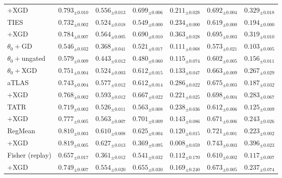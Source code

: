 \documentclass{article} %
\newcommand{\thetab}{\theta_0}
\begin{document}
\begin{table}[t]
\begin{tabular}{lcccccc}
\quad $+$XGD             & $0.793_{\pm0.010}$ & $0.556_{\pm0.013}$ & $0.699_{\pm0.006}$ & $0.211_{\pm0.028}$ & $0.692_{\pm0.004}$ & $0.329_{\pm0.018}$ \\
TIES                     & $0.732_{\pm0.002}$ & $0.524_{\pm0.018}$ & $0.549_{\pm0.000}$ & $0.234_{\pm0.000}$ & $0.619_{\pm0.000}$ & $0.194_{\pm0.000}$ \\
\quad $+$XGD             & $0.784_{\pm0.007}$ & $0.564_{\pm0.005}$ & $0.690_{\pm0.010}$ & $\mathbf{0.363}_{\pm0.028}$ & $0.695_{\pm0.003}$ & $0.319_{\pm0.010}$ \\
\midrule
$\thetab+$GD             & $0.546_{\pm0.032}$ & $0.368_{\pm0.041}$ & $0.521_{\pm0.017}$ & $0.111_{\pm0.068}$ & $0.573_{\pm0.021}$ & $0.103_{\pm0.005}$ \\
$\thetab+$ungated        & $0.579_{\pm0.009}$ & $0.443_{\pm0.012}$ & $0.480_{\pm0.060}$ & $0.115_{\pm0.074}$ & $0.602_{\pm0.005}$ & $0.156_{\pm0.011}$ \\
$\thetab+$XGD            & $0.751_{\pm0.004}$ & $0.524_{\pm0.003}$ & $0.612_{\pm0.015}$ & $0.133_{\pm0.047}$ & $0.663_{\pm0.009}$ & $0.267_{\pm0.029}$ \\
\midrule
aTLAS                    & $0.743_{\pm0.004}$ & $0.577_{\pm0.012}$ & $0.612_{\pm0.014}$ & $0.286_{\pm0.022}$ & $0.675_{\pm0.003}$ & $0.187_{\pm0.032}$ \\
\quad $+$XGD             & $0.768_{\pm0.002}$ & $0.593_{\pm0.012}$ & $0.667_{\pm0.022}$ & $0.221_{\pm0.025}$ & $0.698_{\pm0.004}$ & $0.283_{\pm0.067}$ \\
TATR                     & $0.719_{\pm0.002}$ & $0.526_{\pm0.011}$ & $0.563_{\pm0.008}$ & $0.238_{\pm0.036}$ & $0.612_{\pm0.006}$ & $0.125_{\pm0.009}$ \\
\quad $+$XGD             & $0.777_{\pm0.005}$ & $0.563_{\pm0.007}$ & $\mathbf{0.701}_{\pm0.009}$ & $0.143_{\pm0.086}$ & $0.671_{\pm0.006}$ & $0.243_{\pm0.026}$ \\
RegMean                  & $0.810_{\pm0.003}$ & $0.610_{\pm0.008}$ & $0.625_{\pm0.004}$ & $0.120_{\pm0.015}$ & $0.721_{\pm0.001}$ & $0.223_{\pm0.002}$ \\
\quad $+$XGD             & $\mathbf{0.819}_{\pm0.005}$ & $\mathbf{0.627}_{\pm0.013}$ & $0.369_{\pm0.095}$ & $0.008_{\pm0.059}$ & $\mathbf{0.743}_{\pm0.003}$ & $\mathbf{0.396}_{\pm0.023}$ \\
Fisher (replay)          & $0.657_{\pm0.017}$ & $0.361_{\pm0.012}$ & $0.541_{\pm0.032}$ & $0.112_{\pm0.170}$ & $0.610_{\pm0.002}$ & $0.117_{\pm0.007}$ \\
\quad $+$XGD             & $0.749_{\pm0.007}$ & $0.554_{\pm0.020}$ & $0.655_{\pm0.030}$ & $0.169_{\pm0.240}$ & $0.673_{\pm0.005}$ & $0.237_{\pm0.074}$ \\

\end{tabular}
\end{table}
\end{document}
